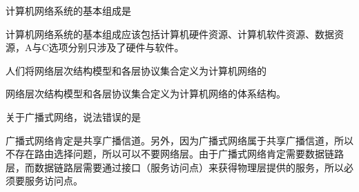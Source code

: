 \question 计算机网络系统的基本组成是
\par{}
\begin{solution}计算机网络系统的基本组成应该包括计算机硬件资源、计算机软件资源、数据资源，A与C选项分别只涉及了硬件与软件。
\end{solution}
\question 人们将网络层次结构模型和各层协议集合定义为计算机网络的
\par{}
\begin{solution}网络层次结构模型和各层协议集合定义为计算机网络的体系结构。
\end{solution}
\question 关于广播式网络，说法错误的是
\par{}
\begin{solution}广播式网络肯定是共享广播信道。另外，因为广播式网络属于共享广播信道，所以不存在路由选择问题，所以可以不要网络层。由于广播式网络肯定需要数据链路层，而数据链路层需要通过接口（服务访问点）来获得物理层提供的服务，所以必须要服务访问点。
\end{solution}
